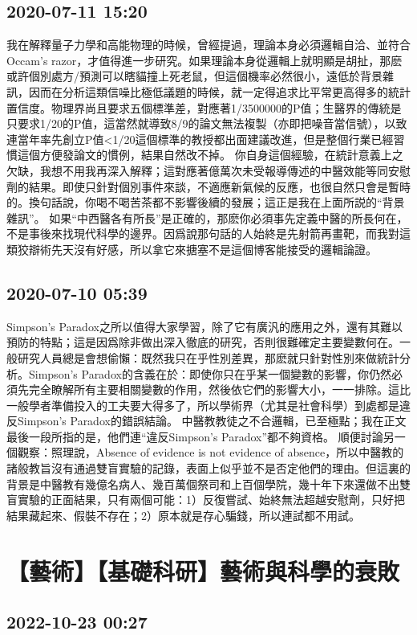 \documentclass[twocolumn]{ctexart}
\begin{document}
\subsection*{2020-07-11 15:20}

我在解釋量子力學和高能物理的時候，曾經提過，理論本身必須邏輯自洽、並符合Occam's razor，才值得進一步研究。如果理論本身從邏輯上就明顯是胡扯，那麽或許個別處方/預測可以瞎貓撞上死老鼠，但這個機率必然很小，遠低於背景雜訊，因而在分析這類信噪比極低議題的時候，就一定得追求比平常更高得多的統計置信度。物理界尚且要求五個標準差，對應著1/3500000的P值；生醫界的傳統是只要求1/20的P值，這當然就導致8/9的論文無法複製（亦即把噪音當信號），以致連當年率先創立P值<1/20這個標準的教授都出面建議改進，但是整個行業已經習慣這個方便發論文的慣例，結果自然改不掉。
你自身這個經驗，在統計意義上之欠缺，我想不用我再深入解釋；這對應著億萬次未受報導傳述的中醫效能等同安慰劑的結果。即使只針對個別事件來談，不適應新氣候的反應，也很自然只會是暫時的。換句話說，你喝不喝苦茶都不影響後續的發展；這正是我在上面所説的“背景雜訊”。
如果“中西醫各有所長”是正確的，那麽你必須事先定義中醫的所長何在，不是事後來找現代科學的邊界。因爲說那句話的人始終是先射箭再畫靶，而我對這類狡辯術先天沒有好感，所以拿它來搪塞不是這個博客能接受的邏輯論證。
\subsection*{2020-07-10 05:39}

Simpson's Paradox之所以值得大家學習，除了它有廣汎的應用之外，還有其難以預防的特點；這是因爲除非做出深入徹底的研究，否則很難確定主要變數何在。一般研究人員總是會想偷懶：既然我只在乎性別差異，那麽就只針對性別來做統計分析。Simpson's Paradox的含義在於：即使你只在乎某一個變數的影響，你仍然必須先完全瞭解所有主要相關變數的作用，然後依它們的影響大小，一一排除。這比一般學者準備投入的工夫要大得多了，所以學術界（尤其是社會科學）到處都是違反Simpson's Paradox的錯誤結論。
中醫教教徒之不合邏輯，已至極點；我在正文最後一段所指的是，他們連“違反Simpson's Paradox”都不夠資格。
順便討論另一個觀察：照理說，Absence of evidence is not evidence of absence，所以中醫教的諸般教旨沒有通過雙盲實驗的記錄，表面上似乎並不是否定他們的理由。但這裏的背景是中醫教有幾億名病人、幾百萬個祭司和上百個學院，幾十年下來還做不出雙盲實驗的正面結果，只有兩個可能：1）反復嘗試、始終無法超越安慰劑，只好把結果藏起來、假裝不存在；2）原本就是存心騙錢，所以連試都不用試。
\section*{【藝術】【基礎科研】藝術與科學的衰敗}
\subsection*{2022-10-23 00:27}
\end{document}
